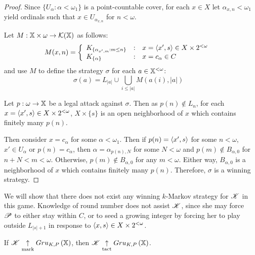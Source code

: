 \begin{proof}
  Since $\{U_\alpha:\alpha<\omega_1\}$ is a point-countable cover,
  for each $x\in X$ let $\alpha_{x,n}<\omega_1$ yield
  ordinals such that $x\in U_{\alpha_{x,n}}$ for $n<\omega$.

  Let $M:\mathbb{X}\times \omega\to \mathcal{K}(\mathbb{X})$ as follows:
    \[
      M(x,n)
        =
      \left\{
        \begin{array}{lcl}
          K_{\{\alpha_{x',m}:m\leq n\}}
        & : &
          x = \langle x',s\rangle \in X\times 2^{<\omega}
        \\
          K_{\{\alpha\}}
        & : &
          x = c_\alpha \in C
        \end{array}
      \right.
    \]
  and use $M$ to define the strategy $\sigma$ for each $a\in\mathbb{X}^{<\omega}$:
    \[
      \sigma(a)
        =
      L_{|a|}
        \cup
      \bigcup_{i\leq |a|}
      M(a(i),|a|)
    \]

  Let $p:\omega\to\mathbb{X}$ be a legal attack against $\sigma$. Then as
  $p(n)\not\in L_n$, for each $x=\langle x',s\rangle\in X\times 2^{<\omega}$,
  $X\times\{s\}$ is an open neighborhood of $x$ which contains finitely
  many $p(n)$.

  Then consider $x=c_\alpha$ for some $\alpha<\omega_1$. Then if
  $p(n)=\langle x',s\rangle$ for some $n<\omega$, $x'\in U_\alpha$ or
  $p(n)=c_\alpha$, then
  $\alpha = \alpha_{p(n),N}$ for some $N<\omega$ and $p(m)\not\in B_{\alpha,0}$
  for $n+N<m<\omega$. Otherwise, $p(m)\not\in B_{\alpha,0}$ for any $m<\omega$.
  Either way, $B_{\alpha,0}$ is a neighborhood of $x$ which contains finitely
  many $p(n)$. Therefore, $\sigma$ is a winning strategy.
\end{proof}

We will show that there does not exist any winning $k$-Markov strategy for
$\mathscr{K}$ in this game. Knowledge of round number does not assist $\mathscr{K}$,
since she may force $\mathscr{P}$ to either stay within $C$, or to seed a growing
integer by forcing her to play outside $L_{|s|+1}$ in response to
$\langle x,s\rangle\in X\times 2^{<\omega}$.

\begin{lem}
  If $\mathscr{K}\underset{\text{mark}}{\uparrow}Gru_{K,P}\left({\mathbb{X}}\right)$, then
  $\mathscr{K}\underset{\text{tact}}{\uparrow}Gru_{K,P}\left({\mathbb{X}}\right)$.
\end{lem}

